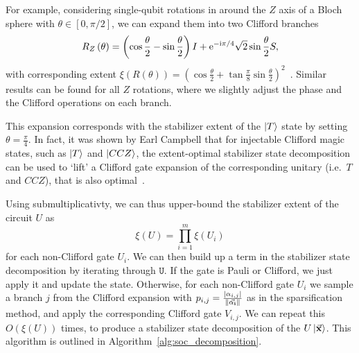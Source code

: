 For example, considering single-qubit rotations in around the $Z$ axis of a Bloch sphere with $\theta\in[0,\pi/2]$, we can expand them into two Clifford branches
\begin{equation}
R_{Z}\left(\theta\right) = \left(\cos{\frac{\theta}{2}}-\sin{\frac{\theta}{2}}\right)I + \mathrm{e}^{-\mathrm{i}\pi/4}\sqrt{2}\sin{\frac{\theta}{2}}S,
\label{eq:rotation_expansion}
\end{equation}
with corresponding extent $\xi\left(R\left(\theta\right)\right)=\left(\cos{\frac{\theta}{2}}+\tan{\frac{\pi}{8}}\sin{\frac{\theta}{2}}\right)^{2}$~\cite{Bravyi2018}. Similar results can be found for all $Z$ rotations, where we slightly adjust the phase and the Clifford operations on each branch.\par
This expansion corresponds with the stabilizer extent of the $\ket{T}$ state by setting $\theta=\frac{\pi}{4}$. In fact, it was shown by Earl Campbell that for injectable Clifford magic states, such as $\ket{T}$ and $\ket{CCZ}$, the extent-optimal stabilizer state decomposition can be used to `lift' a Clifford gate expansion of the corresponding unitary (i.e.\ $T$ and $CCZ$), that is also optimal~\cite{Bravyi2018}.\par
Using submultiplicativty, we can thus upper-bound the stabilizer extent of the circuit $U$ as
\begin{equation}
\xi\left(U\right) = \prod_{i=1}^{m}\xi\left(U_{i}\right)
\end{equation}
for each non-Clifford gate $U_{i}$. We can then build up a term in the stabilizer state decomposition by iterating through $\mathtt{U}$. If the gate is Pauli or Clifford, we just apply it and update the state. Otherwise, for each non-Clifford gate $U_{i}$ we sample a branch $j$ from the Clifford expansion with $p_{i,j}=\frac{\left|\alpha_{i,j}\right|}{\norm{\va{\alpha_{i}}}}$ as in the sparsification method, and apply the corresponding Clifford gate $V_{i,j}$. We can repeat this $O(\xi\left(U\right))$ times, to produce a stabilizer state decomposition of the $U\ket{\va{x}}$. This algorithm is outlined in Algorithm~\ref{alg:soc_decomposition}.\par
